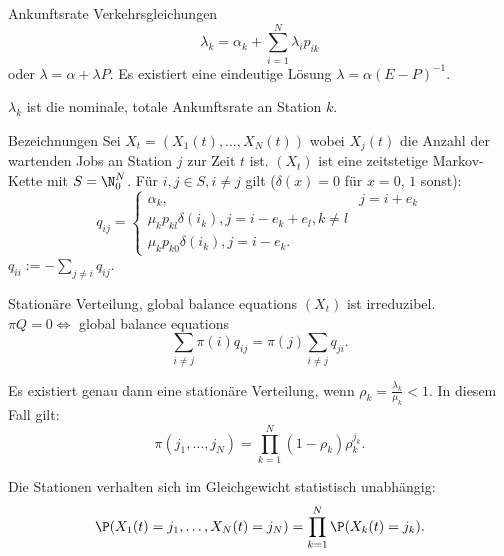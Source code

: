\begin{karte}{Ankunftsrate}
    Verkehrsgleichungen 
    \[ \lambda_k = \alpha_k + \sum_{i=1}^N \lambda_i p_{ik} \]
    oder \(\lambda = \alpha + \lambda P\). Es existiert eine 
    eindeutige Lösung \(\lambda = \alpha (E-P)^{-1}\).

    \(\lambda_k\) ist die nominale, totale Ankunftsrate an 
    Station \(k\).
\end{karte}

\begin{karte}{Bezeichnungen}
    Sei \(X_t = (X_1(t), \ldots,X_N(t))\) wobei 
    \(X_j(t)\) die Anzahl der wartenden Jobs an Station \(j\) 
    zur Zeit \(t\) ist.
    \((X_t)\) ist eine zeitstetige Markov-Kette mit 
    \(S=\N_0^N\). Für \(i,j\in S, i\neq j\) gilt (\(\delta(x) = 0\) für \(x=0\), \(1\) sonst):
    \[ q_{ij} = \begin{cases}
        \alpha_k, & j = i + e_k \\
        \mu_k p_{kl} \delta(i_k), j = i - e_k + e_l, k\neq l \\
        \mu_k p_{k0} \delta(i_k), j=i-e_k.
    \end{cases} \]
    \( q_{ii} := - \sum_{j\neq i} q_{ij} \).
\end{karte}

\begin{karte}{Stationäre Verteilung, global balance equations}
    \((X_t)\) ist irreduzibel. \\
    \(\pi Q = 0 \Leftrightarrow\) global balance equations 
    \[ \sum_{i\neq j} \pi(i) q_{ij} = \pi(j) \sum_{i\neq j} q_{ji}. \]

    Es existiert genau dann eine stationäre Verteilung, 
    wenn \(\rho_k = \frac{\lambda_k}{\mu_k} < 1\).
    In diesem Fall gilt:
    \[ \pi(j_1, \ldots, j_N) = \prod_{k=1}^N (1-\rho_k) \rho_k^{j_k}. \]

    Die Stationen verhalten sich im 
    Gleichgewicht statistisch unabhängig:
    \[ \P(X_1(t) = j_1,\ldots, X_N(t) = j_N) = 
    \prod_{k=1}^N \P(X_k(t)=j_k). \]
\end{karte}